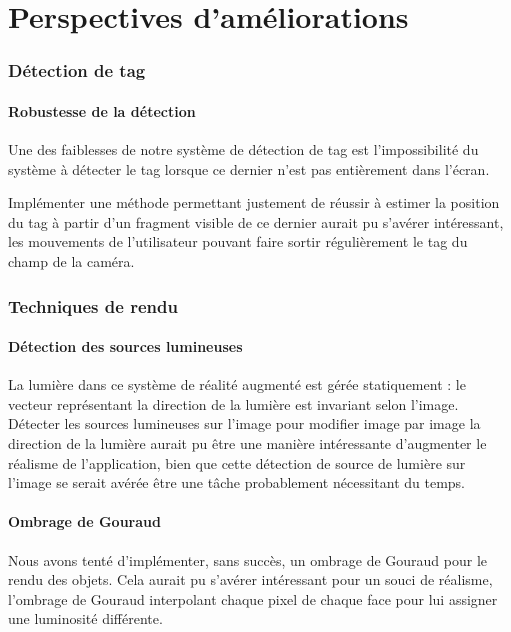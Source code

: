 \part{Perspectives d'améliorations}
\label{part:ameliorations}

\section{Détection de tag}

    \subsection{Robustesse de la détection}

    Une des faiblesses de notre système de détection de tag est l'impossibilité du système à détecter le tag lorsque ce dernier n'est pas entièrement dans l'écran.

    Implémenter une méthode permettant justement de réussir à estimer la position du tag à partir d'un fragment visible de ce dernier aurait pu s'avérer intéressant, les mouvements de l'utilisateur pouvant faire sortir régulièrement le tag du champ de la caméra.

\section{Techniques de rendu}

    \subsection{Détection des sources lumineuses}

    La lumière dans ce système de réalité augmenté est gérée statiquement : le vecteur représentant la direction de la lumière est invariant selon l'image.
    Détecter les sources lumineuses sur l'image pour modifier image par image la direction de la lumière aurait pu être une manière intéressante d'augmenter le réalisme de l'application, bien que cette détection de source de lumière sur l'image se serait avérée être une tâche probablement nécessitant du temps.

    \subsection{Ombrage de Gouraud}

    Nous avons tenté d'implémenter, sans succès, un ombrage de Gouraud pour le rendu des objets. Cela aurait pu s'avérer intéressant pour un souci de réalisme, l'ombrage de Gouraud interpolant chaque pixel de chaque face pour lui assigner une luminosité différente.

